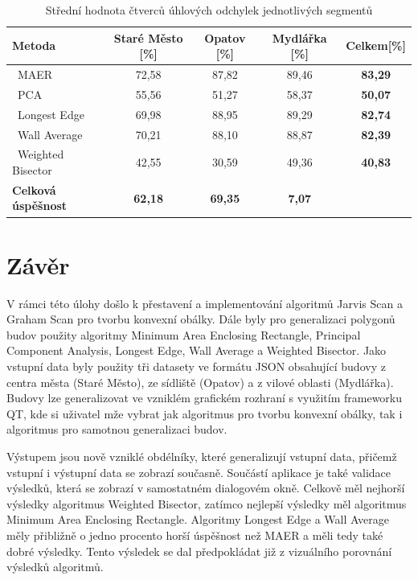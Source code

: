 \documentclass{article}
\begin{document}
\begin{spacing}{1.5}
\begin{table}[htbp]
    \centering
    \begin{tabular}{|l|c|c|c|c|} 
     \hline
         \textbf{Metoda} & \textbf{Staré Město [\%]} & \textbf{Opatov [\%]} & \textbf{Mydlářka [\%]} & \textbf{Celkem[\%]}\\  
             \hline
             \ MAER & 72,58 & 87,82 & 89,46 & \textbf{83,29} \\
             \hline
             \ PCA & 55,56 & 51,27 & 58,37 & \textbf{50,07} \\
             \hline
             \ Longest Edge & 69,98 & 88,95 & 89,29 & \textbf{82,74} \\
             \hline
             \ Wall Average &  70,21 & 88,10 & 88,87 & \textbf{82,39} \\
             \hline
             \ Weighted Bisector & 42,55 & 30,59 &  49,36 &  \textbf{40,83} \\
             \hline
             \textbf {Celková úspěšnost} & \textbf{62,18} & \textbf{69,35} &  \textbf{7,07} &    \\
             \hline
    \end{tabular}
    \caption{Střední hodnota čtverců úhlových odchylek jednotlivých segmentů}
\end{table}

\section{Závěr}
V rámci této úlohy došlo k přestavení a implementování algoritmů Jarvis Scan a Graham Scan pro tvorbu konvexní obálky. Dále byly pro generalizaci polygonů budov použity algoritmy Minimum Area Enclosing Rectangle, Principal Component Analysis, Longest Edge, Wall Average a Weighted Bisector. Jako vstupní data byly použity tři datasety ve formátu JSON obsahující budovy z centra města (Staré Město), ze sídliště (Opatov) a z vilové oblasti (Mydlářka). Budovy lze generalizovat ve vzniklém grafickém rozhraní s využitím frameworku QT, kde si uživatel mže vybrat jak algoritmus pro tvorbu konvexní obálky, tak i algoritmus pro samotnou generalizaci budov.

Výstupem jsou nově vzniklé obdélníky, které generalizují vstupní data, přičemž vstupní i výstupní data se zobrazí současně. Součástí aplikace je také validace výsledků, která se zobrazí v samostatném dialogovém okně. Celkově měl nejhorší výsledky algoritmus Weighted Bisector, zatímco nejlepší výsledky měl algoritmus Minimum Area Enclosing Rectangle. Algoritmy Longest Edge a Wall Average měly přibližně o jedno procento horší úspěšnost než MAER a měli tedy také dobré výsledky. Tento výsledek se dal předpokládat již z vizuálního porovnání výsledků algoritmů. 



\end{spacing}
\end{document}
